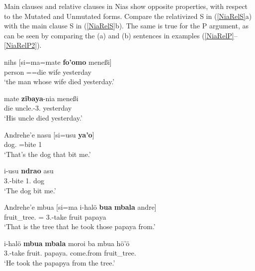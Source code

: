 
Main clauses and relative clauses in Nias show opposite properties, with respect to the Mutated and Unmutated forms.
Compare the relativized S in (\ref{NiaRelS}a) with the main clause S in (\ref{NiaRelS}b). 
The same is true for the P argument, as can be seen by comparing the (a) and (b) sentences in examples (\ref{NiaRelP}--\ref{NiaRelP2}). 

\begin{exe} \ex\label{NiaRelS}
\begin{xlist}
\ex \gll nihs  {\rm[}si=ma=mate \textbf{fo'omo} mene{\ss}i{\rm]}\\
person \relativ{}=\compl{}=die wife yesterday\\
\glt `the man whose wife died yesterday.'

 \ex \gll mate \textbf{zibaya}-nia mene{\ss}i\\
die uncle.\mut{}-3\sg{}.\poss{} yesterday\\
\glt `His uncle died yesterday.' %
\end{xlist} 
\end{exe}

\begin{exe} \ex\label{NiaRelP}
\begin{xlist} 
\ex \gll Andrehe'e {nasu}  {\rm[}si=usu \textbf{ya'o}{\rm]}\\
\dist{} dog.\mut{} \relativ{}=bite 1\sg{}\\
\glt `That's the dog that bit me.'  %

\ex \gll i-usu \textbf{ndrao} {asu}\\
3\sg{}.\rls{}-bite 1\sg{}.\mut{} dog\\
\glt `The dog bit me.' %
\end{xlist}%
\end{exe} 

\pagebreak
\begin{exe} \ex\label{NiaRelP2}
\begin{xlist}
\ex \gll Andrehe'e mbua  {\rm[}si=ma i-hal\"o \textbf{bua} \textbf{mbala} {andre}{\rm]}\\
\dist{} fruit\_tree.\mut{} \relativ{}=\pfv{} 3\sg{}.\rls{}-take fruit papaya \dist{}\\
\glt `That is the tree that he took those papaya from.' %

\ex \gll i-hal\"o \textbf{mbua} \textbf{mbala} moroi ba mbua h\"o'\"o\\
3\sg{}.\rls{}-take fruit.\mut{} papaya.\mut{} come.from \loc{} fruit\_tree.\mut{} \dist{}\\
\glt `He took the papapya from the tree.'
\end{xlist}%
\end{exe} 

